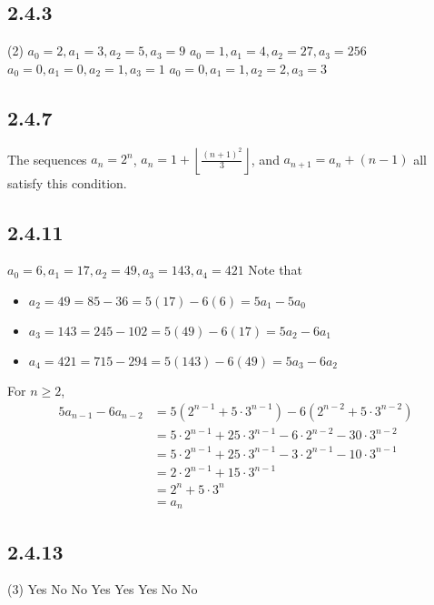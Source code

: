 \documentclass[12pt,titlepage]{extarticle}
\begin{document}
\subsection*{2.4.3}
\begin{tasks}(2)
    \task $a_0 = 2, a_1 = 3, a_2 = 5, a_3 = 9$
    \task $a_0 = 1, a_1 = 4, a_2 = 27, a_3 = 256$
    \task $a_0 = 0, a_1 = 0, a_2 = 1, a_3 = 1$
    \task $a_0 = 0, a_1 = 1, a_2 = 2, a_3 = 3$
\end{tasks}

\subsection*{2.4.7}
The sequences $a_n = 2^n$, $a_n = 1 + \left\lfloor \frac{(n+1)^2}{3} \right\rfloor$, and $a_{n+1} = a_{n} + (n-1)$ all satisfy this condition.

\subsection*{2.4.11}
\begin{tasks}
    \task $a_0 = 6, a_1 = 17, a_2 = 49, a_3 = 143, a_4 = 421$
    \task Note that
    \begin{itemize}
        \item $a_2 = 49 = 85 - 36 = 5(17) - 6(6) = 5 a_1 - 5 a_0$ 
        \item $a_3 = 143 = 245 - 102 = 5(49) - 6(17) = 5 a_2 - 6 a_1$
        \item $a_4 = 421 = 715 - 294 = 5(143) - 6(49) = 5 a_3 - 6 a_2$
    \end{itemize}
    \task 
    For $n \geq 2$,
    \begin{align*}
        5 a_{n-1} - 6 a_{n-2} &= 5 (2^{n-1} + 5 \cdot 3^{n-1}) - 6(2^{n-2} + 5\cdot 3^{n-2}) \\
                              &= 5 \cdot 2^{n-1} + 25 \cdot 3^{n-1} - 6 \cdot 2^{n-2} - 30 \cdot 3^{n-2} \\
                              &= 5 \cdot 2^{n-1} + 25 \cdot 3^{n-1} - 3 \cdot 2^{n-1} - 10 \cdot 3^{n-1} \\
                              &= 2 \cdot 2^{n-1} + 15 \cdot 3^{n-1} \\
                              &= 2^n + 5 \cdot 3^n \\
                              &= a_n
    \end{align*}
\end{tasks}

\subsection*{2.4.13}
\begin{tasks}(3)
    \task Yes
    \task No
    \task No
    \task Yes 
    \task Yes
    \task Yes
    \task No
    \task No
\end{tasks}
\end{document}
